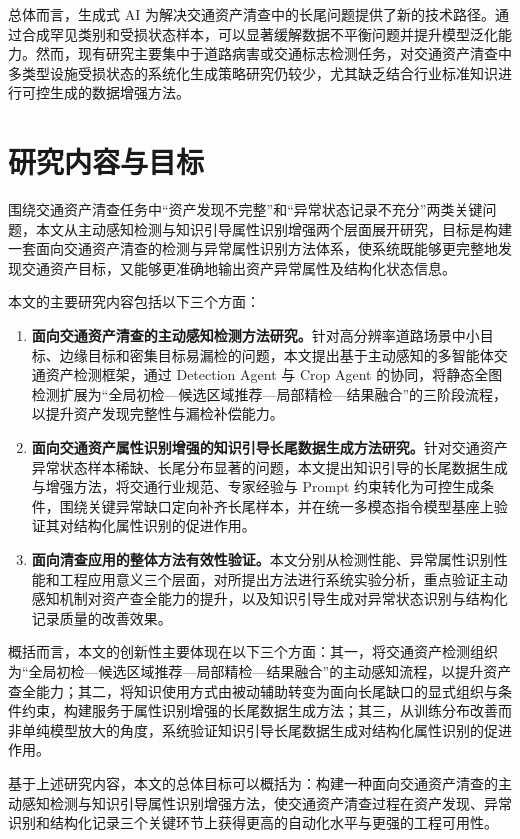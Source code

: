 总体而言，生成式 AI 为解决交通资产清查中的长尾问题提供了新的技术路径。通过合成罕见类别和受损状态样本，可以显著缓解数据不平衡问题并提升模型泛化能力。然而，现有研究主要集中于道路病害或交通标志检测任务，对交通资产清查中多类型设施受损状态的系统化生成策略研究仍较少，尤其缺乏结合行业标准知识进行可控生成的数据增强方法。


\section{研究内容与目标}
围绕交通资产清查任务中“资产发现不完整”和“异常状态记录不充分”两类关键问题，本文从主动感知检测与知识引导属性识别增强两个层面展开研究，目标是构建一套面向交通资产清查的检测与异常属性识别方法体系，使系统既能够更完整地发现交通资产目标，又能够更准确地输出资产异常属性及结构化状态信息。

本文的主要研究内容包括以下三个方面：
\begin{enumerate}
    \item \textbf{面向交通资产清查的主动感知检测方法研究。}针对高分辨率道路场景中小目标、边缘目标和密集目标易漏检的问题，本文提出基于主动感知的多智能体交通资产检测框架，通过 Detection Agent 与 Crop Agent 的协同，将静态全图检测扩展为“全局初检—候选区域推荐—局部精检—结果融合”的三阶段流程，以提升资产发现完整性与漏检补偿能力。
    \item \textbf{面向交通资产属性识别增强的知识引导长尾数据生成方法研究。}针对交通资产异常状态样本稀缺、长尾分布显著的问题，本文提出知识引导的长尾数据生成与增强方法，将交通行业规范、专家经验与 Prompt 约束转化为可控生成条件，围绕关键异常缺口定向补齐长尾样本，并在统一多模态指令模型基座上验证其对结构化属性识别的促进作用。
    \item \textbf{面向清查应用的整体方法有效性验证。}本文分别从检测性能、异常属性识别性能和工程应用意义三个层面，对所提出方法进行系统实验分析，重点验证主动感知机制对资产查全能力的提升，以及知识引导生成对异常状态识别与结构化记录质量的改善效果。
\end{enumerate}

概括而言，本文的创新性主要体现在以下三个方面：其一，将交通资产检测组织为“全局初检—候选区域推荐—局部精检—结果融合”的主动感知流程，以提升资产查全能力；其二，将知识使用方式由被动辅助转变为面向长尾缺口的显式组织与条件约束，构建服务于属性识别增强的长尾数据生成方法；其三，从训练分布改善而非单纯模型放大的角度，系统验证知识引导长尾数据生成对结构化属性识别的促进作用。

基于上述研究内容，本文的总体目标可以概括为：构建一种面向交通资产清查的主动感知检测与知识引导属性识别增强方法，使交通资产清查过程在资产发现、异常识别和结构化记录三个关键环节上获得更高的自动化水平与更强的工程可用性。


